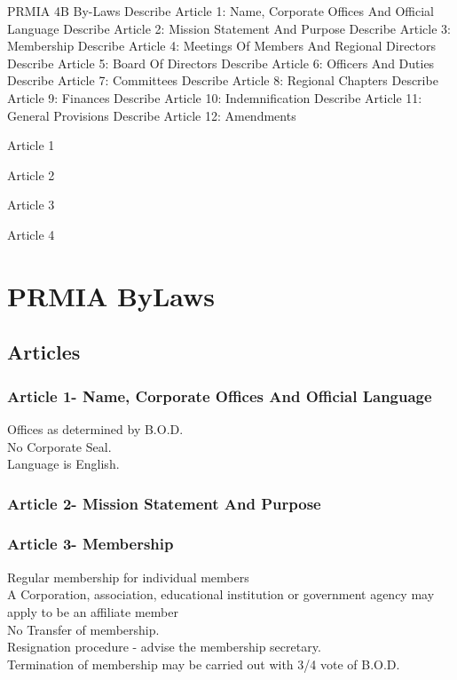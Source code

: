 PRMIA 4B By-Laws
Describe Article 1: Name, Corporate Offices And Official Language
Describe Article 2: Mission Statement And Purpose
Describe Article 3: Membership
Describe Article 4: Meetings Of Members And Regional Directors
Describe Article 5: Board Of Directors
Describe Article 6: Officers And Duties
Describe Article 7: Committees
Describe Article 8: Regional Chapters
Describe Article 9: Finances
Describe Article 10: Indemnification
Describe Article 11: General Provisions
Describe Article 12: Amendments 

Article 1
 
Article 2
 
Article 3
 
Article 4
 


\section{PRMIA ByLaws}
\subsection{Articles}
\subsubsection{Article 1- Name, Corporate Offices And Official
Language}Offices as determined by B.O.D. \\No Corporate Seal.\\
Language is English.
\subsubsection{Article 2- Mission Statement And Purpose}
\subsubsection{Article 3- Membership} Regular
membership for individual members\\ A Corporation, association,
educational institution or government agency may apply to be an
affiliate member\\ No Transfer of membership.\\Resignation
procedure - advise the membership secretary.
\\Termination of membership may be carried out with 3/4 vote of
B.O.D.
